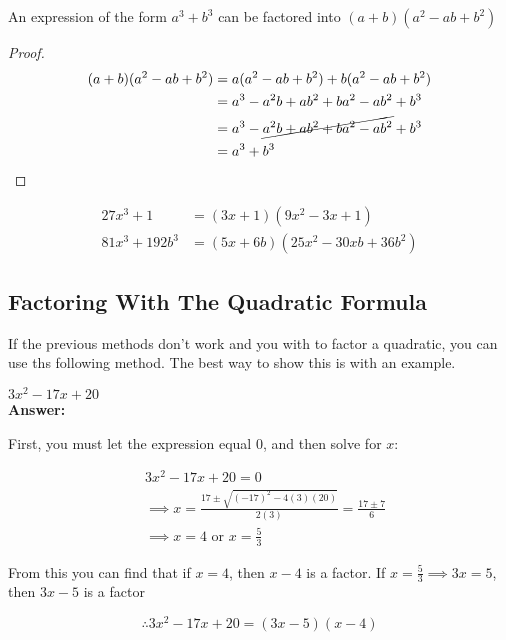 \documentclass[english,seminar]{lecture}
\begin{document}
\begin{theorem}
	An expression of the form $a^3 + b^3$ can be factored into $(a + b)(a^2 - ab + b^2)$	
\end{theorem}

\begin{proof}
	\begin{align*}
		  (a+b)(a^2 - ab +b^2 )
		&= a(a^2 - ab +b^2 ) + b(a^2 - ab +b^2 ) \\
		&= a^3 - a^2b + ab^2 + ba^2 - ab^2 + b^3  \\
		&= a^3 - \cancel{a^2b + ab^2 + ba^2 - ab^2} + b^3  \\
		&= a^3 + b^3
	\end{align*}
\end{proof}

\begin{example}[Factor]
	\begin{align*}
		27x^3 + 1 &= (3x + 1)(9x^2 - 3x + 1) \\
		81x^3 + 192b^3 &= (5x + 6b)(25x^2 - 30xb + 36b^2)
	\end{align*}	
\end{example}

\subsection{Factoring With The Quadratic Formula}

If the previous methods don't work and you with to factor a quadratic, you can use ths following method.
The best way to show this is with an example.

\begin{example}[Factor]
	$3x^2 - 17x + 20$\\
\textbf{Answer:}

First, you must let the expression equal $0$, and then solve for $x$:

\begin{align*}
	&3x^2 - 17x + 20 = 0\\
	&\implies x
	= \frac{17 \pm \sqrt{(-17)^2 - 4(3)(20)}}{2(3)}
	= \frac{17 \pm 7}{6}\\
	&\implies x = 4 \text{ or } x = \frac{5}{3}
\end{align*}

From this you can find that if $x = 4$, then $x- 4$ is a factor.
If $x = \frac{5}{3} \implies 3x = 5$, then $3x - 5$ is a factor

$$
\therefore 3x^2 - 17x + 20 = (3x -5)(x - 4)
$$
\end{example}
\end{document}

